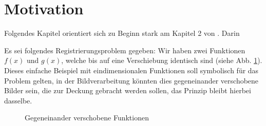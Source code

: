 %
%
%

\section{Motivation
\label{mellin:section:teil1}}

Folgendes Kapitel orientiert sich zu Beginn stark am Kapitel 2 von
\cite{mellin:mendezmueller-book}.
Darin 
\smallskip

Es sei folgendes Registrierungsproblem gegeben: Wir haben zwei Funktionen 
$f(x)$ und $g(x)$, welche bis auf eine Verschiebung identisch sind 
(siehe Abb. \ref{fig:mellin:f1}).
Dieses einfache Beispiel mit eindimensionalen Funktionen soll symbolisch 
für das Problem gelten, in der Bildverarbeitung könnten dies gegeneinander 
verschobene Bilder sein, die zur Deckung gebracht werden sollen, das 
Prinzip bleibt hierbei dasselbe.
\begin{figure}
    \centering
    \caption{Gegeneinander verschobene Funktionen
    \label{fig:mellin:f1}}
\end{figure}

